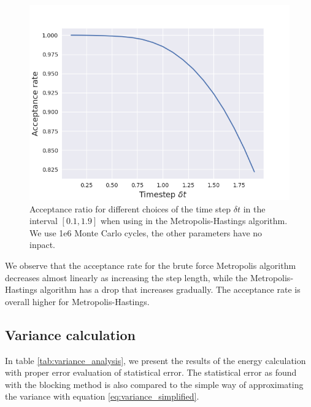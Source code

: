 \documentclass[norsk,a4paper,12pt]{article}
\begin{document}
\begin{figure} [H]
	\centering
	\includegraphics[scale=0.65]{images/acceptance_IS.png}
	\caption{Acceptance ratio for different choices of the time step $\delta t$ in the interval $[0.1,1.9]$ when using in the Metropolis-Hastings algorithm. We use 1e6 Monte Carlo cycles, the other parameters have no inpact.}
	\label{fig:acceptance_IS_timestep}
\end{figure} 
We observe that the acceptance rate for the brute force Metropolis algorithm decreases almost linearly as increasing the step length, while the Metropolis-Hastings algorithm has a drop that increases gradually. The acceptance rate is overall higher for Metropolis-Hastings.


\subsection{Variance calculation}

In table \ref{tab:variance_analysis}, we present the results of the energy calculation with proper error evaluation of statistical error. The statistical error as found with the blocking method is also compared to the simple way of approximating the variance with equation \ref{eq:variance_simplified}. 
\end{document}
